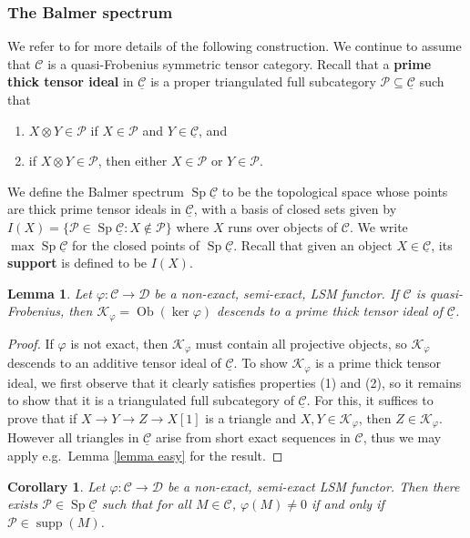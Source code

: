 \documentclass[11pt]{amsart}
\def\ker{\operatorname{ker}}
\def\KK{\mathcal{K}}
\def\PP{\mathcal{P}}
\def\Cs{\mathcal{C}}
\def\Cs{\mathscr{C}}
\def\Ds{\mathscr{D}}
\def\ul{\underline}
\def\sub{\subseteq}
\def\Sp{\operatorname{Sp}}
\newtheorem{cor}[thm]{Corollary}
\newtheorem{lemma}[thm]{Lemma}
\theoremstyle{definition}
\theoremstyle{remark}
\numberwithin{equation}{section}
\begin{document}
\subsubsection{The Balmer spectrum} We refer to \cite{Bal} for more details of the following construction.  We continue to assume that $\Cs$ is a quasi-Frobenius symmetric tensor category.  Recall that a \textbf{prime thick tensor ideal} in $\ul{\Cs}$ is a proper triangulated full subcategory $\PP\sub\ul{\Cs}$ such that
\begin{enumerate}
    \item $X\otimes Y\in\PP$ if $X\in \PP$ and $Y\in\ul{\Cs}$, and
    \item if $X\otimes Y\in\PP$, then either $X\in\PP$ or $Y\in\PP$.
\end{enumerate}
We define the Balmer spectrum $\operatorname{Sp}\ul{\Cs}$ to be the topological space whose points are thick prime tensor ideals in $\ul{\Cs}$, with a basis of closed sets given by $I(X)=\{\PP\in\Sp\ul{\Cs}:X\notin\PP\}$ where $X$ runs over objects of $\Cs$. We write $\max\Sp\ul{\Cs}$ for the closed points of $\Sp\ul{\Cs}$.  Recall that given an object $X\in\ul{\Cs}$, its \textbf{support} is defined to be $I(X)$.

\begin{lemma}\label{lemma semi exact gives prime ideal}
    Let $\varphi:\Cs\to\Ds$ be a non-exact, semi-exact, LSM functor.  If $\Cs$ is quasi-Frobenius, then $\KK_{\varphi}=\operatorname{Ob}(\ker\varphi)$ descends to a prime thick tensor ideal of $\ul{\Cs}$. 
\end{lemma}

\begin{proof}
   If $\varphi$ is not exact, then $\KK_{\varphi}$ must contain all projective objects, so $\KK_{\varphi}$ descends to an additive tensor ideal of $\ul{\Cs}$.  To show $\KK_{\varphi}$ is a prime thick tensor ideal, we first observe that it clearly satisfies properties (1) and (2), so it remains to show that it is a triangulated full subcategory of $\ul{\Cs}$.  For this, it suffices to prove that if $X\to Y\to Z\to X[1]$ is a triangle and $X,Y\in\KK_{\varphi}$, then $Z\in\KK_{\varphi}$.  However all triangles in $\ul{\Cs}$ arise from short exact sequences in $\Cs$, thus we may apply e.g.~Lemma \ref{lemma easy} for the result.
\end{proof}

\begin{cor}\label{cor support}
    Let $\varphi:\Cs\to\Ds$ be a non-exact, semi-exact LSM functor.  Then there exists $\PP\in\Sp\ul{\Cs}$ such that for all $M\in\Cs$, $\varphi(M)\neq0$ if and only if $\PP\in\operatorname{supp}(M)$.
\end{cor}
\end{document}
